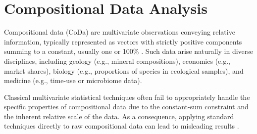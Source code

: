\documentclass[
	12pt,				%
	oneside,			%
	a4paper,			%
	english,			%
	brazil				%
	]{abntex2ppgsi}
\begin{document}




\section{Compositional Data Analysis}
Compositional data (CoDa) are multivariate observations conveying relative information, typically represented as vectors with strictly positive components summing to a constant, usually one or 100\% \cite{aitchison1982statistical}. Such data arise naturally in diverse disciplines, including geology (e.g., mineral compositions), economics (e.g., market shares), biology (e.g., proportions of species in ecological samples), and medicine (e.g., time-use or microbiome data).

Classical multivariate statistical techniques often fail to appropriately handle the specific properties of compositional data due to the constant-sum constraint and the inherent relative scale of the data. As a consequence, applying standard techniques directly to raw compositional data can lead to misleading results \cite{pawlowsky2015modelling}.
\end{document}
